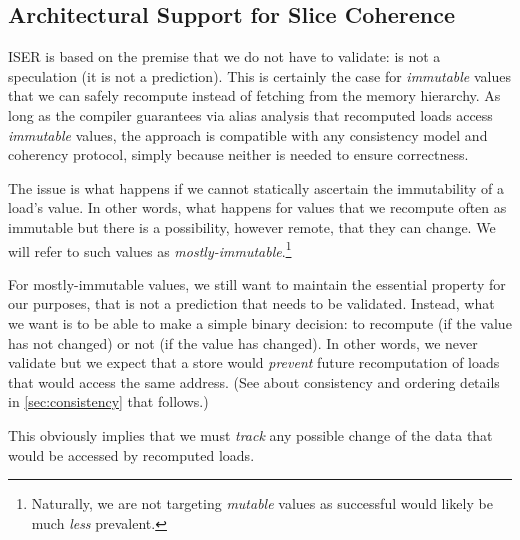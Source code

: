 
\subsection{Architectural Support for Slice Coherence}
\label{sec:coherence}
ISER is based on the premise that we do not have to validate: {\recomp} is not a speculation (it is not a prediction). This is certainly the case for \emph{immutable} values that we can safely recompute instead of fetching from the memory hierarchy. As long as the compiler guarantees via alias analysis that recomputed loads access \emph{immutable} values, the approach is compatible with any consistency model and coherency protocol, simply because neither is needed to ensure correctness.

The issue is what happens if we cannot statically ascertain the immutability of a load's value. In other words, what happens for values that we recompute often as immutable but there is a possibility, however remote, that they can change. We will refer to such values as \emph{mostly-immutable}.\footnote{Naturally, we are not targeting \emph{mutable} values as successful {\recomp} would likely be much \emph{less} prevalent.}

For mostly-immutable values, we still want to maintain the essential property for our purposes, that {\recomp} is not a prediction that needs to be validated. Instead, what we want is to be able to make a simple binary decision: to recompute (if the value has not changed) or not (if the value has changed). In other words, we never validate {\recomp} but we expect that a store would \emph{prevent} future recomputation of loads that would access the same address. (See about consistency and ordering details in \autoref{sec:consistency} that follows.) 

This obviously implies that we must \emph{track} any possible change of the data that would be accessed by recomputed loads.

